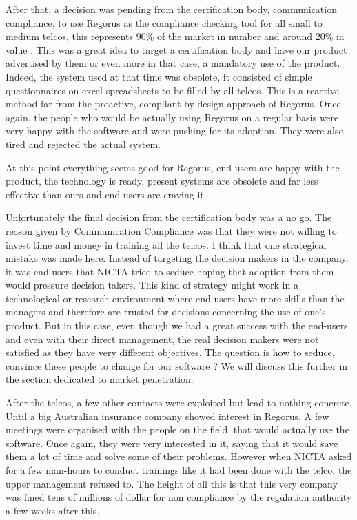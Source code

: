 \documentclass[10pt]{report}
\begin{document}
After that, a decision was pending from the certification body, communication compliance, to use Regorus as the compliance checking tool for all small to medium telcos, this represents 90\% of the market in number and around 20\% in value \autocite{telcoIndustryStats}. This was a great idea to target a certification body and have our product advertised by them or even more in that case, a mandatory use of the product. Indeed, the system used at that time was obsolete, it consisted of simple questionnaires on excel spreadsheets to be filled by all telcos. This is a reactive method far from the proactive, compliant-by-design approach of Regorus. Once again, the people who would be actually using Regorus on a regular basis were very happy with the software and were pushing for its adoption. They were also tired and rejected the actual system.

At this point everything seems good for Regorus, end-users are happy with the product, the technology is ready, present systems are obsolete and far less effective than ours and end-users are craving it.

Unfortunately the final decision from the certification body was a no go. The reason given by Communication Compliance was that they were not willing to invest time and money in training all the telcos. I think that one strategical mistake was made here. Instead of targeting the decision makers in the company, it was end-users that NICTA tried to seduce hoping that adoption from them would pressure decision takers. This kind of strategy might work in a technological or research environment where end-users have more skills than the managers and therefore are trusted for decisions concerning the use of one's product. But in this case, even though we had a great success with the end-users and even with their direct management, the real decision makers were not satisfied as they have very different objectives. The question is how to seduce, convince these people to change for our software ? We will discuss this further in the section dedicated to market penetration.

After the telcos, a few other contacts were exploited but lead to nothing concrete. Until a big Australian insurance company showed interest in Regorus. A few meetings were organised with the people on the field, that would actually use the software. Once again, they were very interested in it, saying that it would save them a lot of time and solve some of their problems. However when NICTA asked for a few man-hours to conduct trainings like it had been done with the telco, the upper management refused to. The height of all this is that this very company was fined tens of millions of dollar for non compliance by the regulation authority a few weeks after this.
\end{document}
